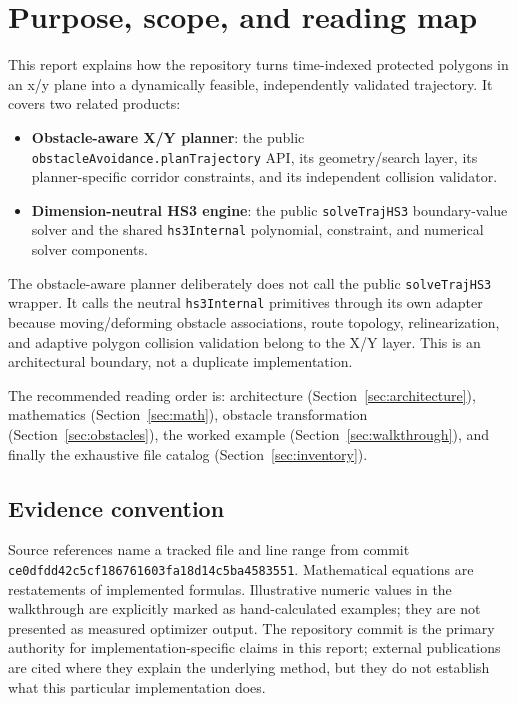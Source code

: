 \documentclass[10pt,letterpaper]{article}
\newcommand{\file}[1]{\nolinkurl{#1}}
\newcommand{\term}[1]{\textbf{#1}}
\begin{document}
\tableofcontents
\clearpage

\section{Purpose, scope, and reading map}

This report explains how the repository turns time-indexed protected polygons
in an x/y plane into a dynamically feasible, independently
validated trajectory. It covers two related products:

\begin{itemize}
  \item \term{Obstacle-aware X/Y planner}: the public
  \file{obstacleAvoidance.planTrajectory} API, its geometry/search layer, its
  planner-specific corridor constraints, and its independent collision
  validator.
  \item \term{Dimension-neutral HS3 engine}: the public
  \file{solveTrajHS3} boundary-value solver and the shared
  \file{hs3Internal} polynomial, constraint, and numerical solver components.
\end{itemize}

The obstacle-aware planner deliberately does not call the public
\file{solveTrajHS3} wrapper. It calls the neutral \file{hs3Internal}
primitives through its own adapter because moving/deforming obstacle
associations, route topology, relinearization, and adaptive polygon collision
validation belong to the X/Y layer. This is an architectural boundary, not a
duplicate implementation.

The recommended reading order is: architecture (Section~\ref{sec:architecture}),
mathematics (Section~\ref{sec:math}), obstacle transformation
(Section~\ref{sec:obstacles}), the worked example
(Section~\ref{sec:walkthrough}), and finally the exhaustive file catalog
(Section~\ref{sec:inventory}).

\subsection{Evidence convention}

Source references name a tracked file and line range from commit
\file{ce0dfdd42c5cf186761603fa18d14c5ba4583551}. Mathematical equations are
restatements of implemented formulas. Illustrative numeric values in the
walkthrough are explicitly marked as hand-calculated examples; they are not
presented as measured optimizer output. The repository commit is the primary
authority for implementation-specific claims in this report\cite{repoCommit};
external publications are cited where they explain the underlying method, but
they do not establish what this particular implementation does.
\end{document}
